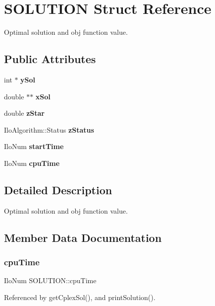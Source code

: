 \section{S\+O\+L\+U\+T\+I\+ON Struct Reference}
\label{structSOLUTION}


Optimal solution and obj function value.  


\subsection*{Public Attributes}
\begin{DoxyCompactItemize}
\item 
int $\ast$ \textbf{ y\+Sol}
\item 
double $\ast$$\ast$ \textbf{ x\+Sol}
\item 
double \textbf{ z\+Star}
\item 
Ilo\+Algorithm\+::\+Status \textbf{ z\+Status}
\item 
Ilo\+Num \textbf{ start\+Time}
\item 
Ilo\+Num \textbf{ cpu\+Time}
\end{DoxyCompactItemize}


\subsection{Detailed Description}
Optimal solution and obj function value. 

\subsection{Member Data Documentation}
\mbox{\label{structSOLUTION_adfe9fcb60f1b7f7e5cf40c2e67a358ac}} 
\subsubsection{cpu\+Time}
{\footnotesize\ttfamily Ilo\+Num S\+O\+L\+U\+T\+I\+O\+N\+::cpu\+Time}



Referenced by get\+Cplex\+Sol(), and print\+Solution().

\mbox{\label{structSOLUTION_a3a5f379eb28419f4f4e2bde3503b1490}} 
